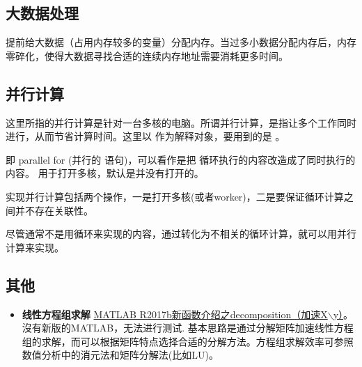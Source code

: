 \subsection{大数据处理}

提前给大数据（占用内存较多的变量）分配内存。当过多小数据分配内存后，内存零碎化，使得大数据寻找合适的连续内存地址需要消耗更多时间。





\subsection{并行计算}

这里所指的并行计算是针对一台多核的电脑。所谓并行计算，是指让多个工作同时进行，从而节省计算时间。这里以  作为解释对象，要用到的是 。\par

 即 parallel for (并行的  语句)，可以看作是把  循环执行的内容改造成了同时执行的内容。  用于打开多核，默认是并没有打开的。\par

实现并行计算包括两个操作，一是打开多核(或者worker)，二是要保证循环计算之间并不存在关联性。

\vspace{-0.8cm}


\vspace{-0.8cm}


尽管通常不是用循环来实现的内容，通过转化为不相关的循环计算，就可以用并行计算来实现。















\subsection{其他}

\begin{itemize}
    \item \textbf{线性方程组求解} \href{https://zhuanlan.zhihu.com/p/30958676}{MATLAB R2017b新函数介绍之decomposition（加速X$\backslash$y）}。沒有新版的MATLAB，无法进行测试. 基本思路是通过分解矩阵加速线性方程组的求解，而可以根据矩阵特点选择合适的分解方法。方程组求解效率可参照数值分析中的消元法和矩阵分解法(比如LU)。
\end{itemize}